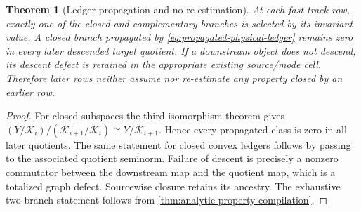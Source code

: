 \documentclass[11pt]{article}
\numberwithin{section}{part}
\theoremstyle{plain}
\newtheorem{theorem}{Theorem}[section]
\theoremstyle{definition}
\theoremstyle{remark}
\begin{document}
\begin{theorem}[Ledger propagation and no re-estimation]
\label{thm:physical-ledger-propagation}
At each fast-track row, exactly one of the closed and complementary branches
is selected by its invariant value.  A closed branch propagated by
\eqref{eq:propagated-physical-ledger} remains zero in every later descended
target quotient.  If a downstream object does not descend, its descent
defect is retained in the appropriate existing source/mode cell.  Therefore
later rows neither assume nor re-estimate any property closed by an earlier
row.
\end{theorem}

\begin{proof}
For closed subspaces the third isomorphism theorem gives
\((Y/\mathcal K_i)/(\mathcal K_{i+1}/\mathcal K_i)\cong
Y/\mathcal K_{i+1}\).  Hence every propagated class is zero in all later
quotients.  The same statement for closed convex ledgers follows by passing
to the associated quotient seminorm.  Failure of descent is precisely a
nonzero commutator between the downstream map and the quotient map, which is
a totalized graph defect.  Sourcewise closure retains its ancestry.  The
exhaustive two-branch statement follows from
\cref{thm:analytic-property-compilation}.
\end{proof}
\end{document}
